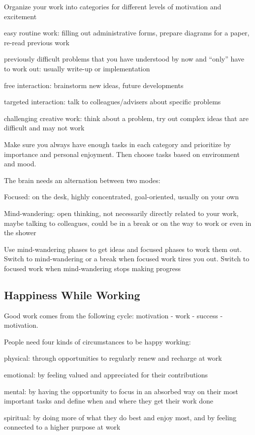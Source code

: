 \documentclass[12pt]{article}
\begin{document}
Organize your work into categories for different levels of motivation and excitement
\begin{compactitem}
 \item easy routine work: filling out administrative forms, prepare diagrams for a paper, re-read previous work
 \item previously difficult problems that you have understood by now and ``only'' have to work out: usually write-up or implementation
 \item free interaction: brainstorm new ideas, future developments
 \item targeted interaction: talk to colleagues/advisers about specific problems
 \item challenging creative work: think about a problem, try out complex ideas that are difficult and may not work
\end{compactitem}
Make sure you always have enough tasks in each category and prioritize by importance and personal enjoyment.
Then choose tasks based on environment and mood.
\medskip

The brain needs an alternation between two modes:
\begin{compactitem}
\item Focused: on the desk, highly concentrated, goal-oriented, usually on your own
\item Mind-wandering: open thinking, not necessarily directly related to your work, maybe talking to colleagues, could be in a break or on the way to work or even in the shower
\end{compactitem}
Use mind-wandering phases to get ideas and focused phases to work them out.
Switch to mind-wandering or a break when focused work tires you out.
Switch to focused work when mind-wandering stops making progress

\subsection{Happiness While Working}

Good work comes from the following cycle: motivation - work - success - motivation.
\medskip

People need four kinds of circumstances to be happy working:
\begin{compactitem}
\item physical: through opportunities to regularly renew and recharge at work
\item emotional: by feeling valued and appreciated for their contributions
\item mental: by having the opportunity to focus in an absorbed way on their most important tasks and define when and where they get their work done
\item spiritual: by doing more of what they do best and enjoy most, and by feeling connected to a higher purpose at work
\end{compactitem}
\medskip
\end{document}
